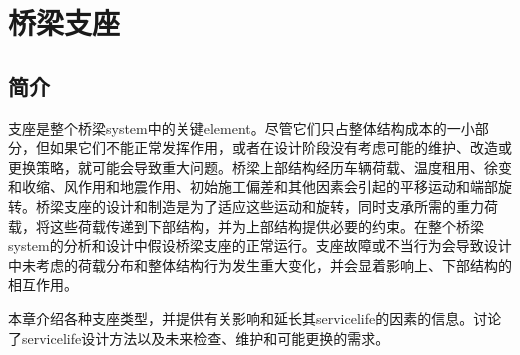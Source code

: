 \chapter{桥梁支座}\label{chp:bridge-bearings}
\section{简介}
支座是整个桥梁\gls*{system}中的关键\gls*{element}。尽管它们只占整体结构成本的一小部分，但如果它们不能正常发挥作用，或者在设计阶段没有考虑可能的维护、改造或更换策略，就可能会导致重大问题。桥梁上部结构经历车辆荷载、温度租用、徐变和收缩、风作用和地震作用、初始施工偏差和其他因素会引起的平移运动和端部旋转。桥梁支座的设计和制造是为了适应这些运动和旋转，同时支承所需的重力荷载，将这些荷载传递到下部结构，并为上部结构提供必要的约束。在整个桥梁\gls*{system}的分析和设计中假设桥梁支座的正常运行。支座故障或不当行为会导致设计中未考虑的荷载分布和整体结构行为发生重大变化，并会显着影响上、下部结构的相互作用。

本章介绍各种支座类型，并提供有关影响和延长其\gls*{servicelife}的因素的信息。讨论了\gls*{servicelife}设计方法以及未来检查、维护和可能更换的需求。

